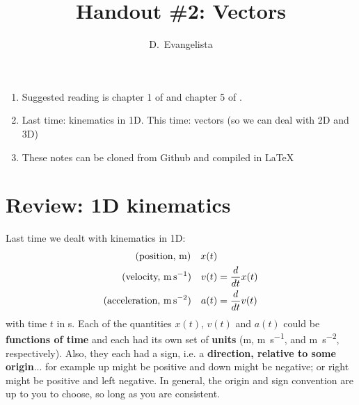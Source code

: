 \documentclass{tufte-handout}
\title{Handout \#2: Vectors}
\author{D.~Evangelista}
\date{\printdate{6/21/2021}}
\begin{document}
\maketitle
\begin{enumerate}
\item Suggested reading is chapter 1 of \citeauthor{kleppner2014introduction}\cite{kleppner2014introduction} and chapter 5 of \citeauthor{greenspan1987calculus}\cite{greenspan1987calculus}. 
\item Last time: kinematics in 1D. This time: vectors (so we can deal with 2D and 3D)
\item These notes can be cloned from Github and compiled in \LaTeX{}
\end{enumerate}

\section{Review: 1D kinematics} 
Last time we dealt with kinematics in 1D:
\begin{align}
\text{(position, \si{\meter})}\quad x(t) & \\
\text{(velocity, \si{\meter\per\second})}\quad v(t) &= \frac{d}{dt} x(t) \\
\text{(acceleration, \si{\meter\per\second\squared})}\quad a(t) &= \frac{d}{dt} v(t)
\end{align}
with time $t$ in \si{\second}. Each of the quantities $x(t)$, $v(t)$ and $a(t)$ could be \textbf{functions of time} and each had its own set of \textbf{units} (\si{\meter}, \si{\meter\per\second}, and \si{\meter\per\second\squared}, respectively). Also, they each had a sign, i.e. a \textbf{direction, relative to some origin}... for example up might be positive and down might be negative; or right might be positive and left negative. In general, the origin and sign convention are up to you to choose, so long as you are consistent.
\end{document}
